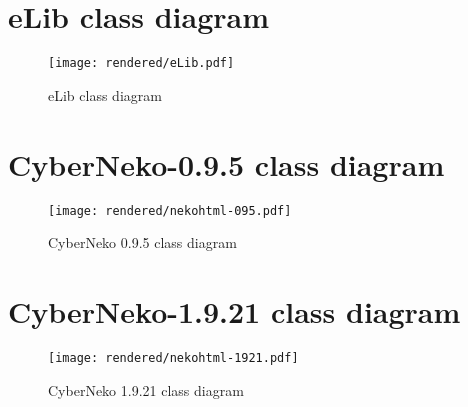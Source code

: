 \documentclass[a4paper,twoside,11pt]{article}
\begin{document}
\newpage
\begin{appendices}
\section{eLib class diagram} \label{appendix:eLibDiagram}
\begin{figure}[h]
	\texttt{[image: rendered/eLib.pdf]}
	\caption{eLib class diagram}
\end{figure}
\newpage
\section{CyberNeko-0.9.5 class diagram} \label{appendix:neko0}
\begin{figure}[h]
	\texttt{[image: rendered/nekohtml-095.pdf]}
	\centering
	\caption{CyberNeko 0.9.5 class diagram}
\end{figure}
\newpage
\section{CyberNeko-1.9.21 class diagram} \label{appendix:neko1}
\begin{figure}[h]
	\texttt{[image: rendered/nekohtml-1921.pdf]}
	\centering
	\caption{CyberNeko 1.9.21 class diagram}
\end{figure}
\end{appendices}
\end{document}
